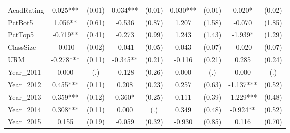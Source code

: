 \begin{sidewaystable}[htb]
\begin{threeparttable}
\begin{tabular}{l|c|c|c|c|c|c|c|c}
      AcadRating        & 0.025***                     & (0.01)                       & 0.034***                    & (0.01)               & 0.030***             & (0.01)               & 0.020*               & (0.02)               \\
      PctBot5           & 1.056**                      & (0.61)                       & -0.536                      & (0.87)               & 1.207                & (1.58)               & -0.070               & (1.85)               \\
      PctTop5           & -0.719**                     & (0.41)                       & -0.273                      & (0.99)               & 1.243                & (1.43)               & -1.939*              & (1.29)               \\
      ClassSize         & -0.010                       & (0.02)                       & -0.041                      & (0.05)               & 0.043                & (0.07)               & -0.020               & (0.07)               \\
      URM               & -0.278***                    & (0.11)                       & -0.345**                    & (0.21)               & -0.116               & (0.21)               & 0.285                & (0.24)               \\
      Year\_2011        & 0.000                        & (.)                          & -0.128                      & (0.26)               & 0.000                & (.)                  & 0.000                & (.)                  \\
      Year\_2012        & 0.455***                     & (0.11)                       & 0.208                       & (0.23)               & 0.257                & (0.63)               & -1.137***            & (0.52)               \\
      Year\_2013        & 0.359***                     & (0.12)                       & 0.360*                      & (0.25)               & 0.111                & (0.39)               & -1.229***            & (0.48)               \\
      Year\_2014        & 0.308***                     & (0.11)                       & 0.000                       & (.)                  & 0.349                & (0.48)               & -0.924**             & (0.52)               \\
      Year\_2015        & 0.155                        & (0.19)                       & -0.059                      & (0.32)               & -0.930               & (0.85)               & 0.116                & (0.70)               \\

\end{tabular}
\end{threeparttable}
\end{sidewaystable}
